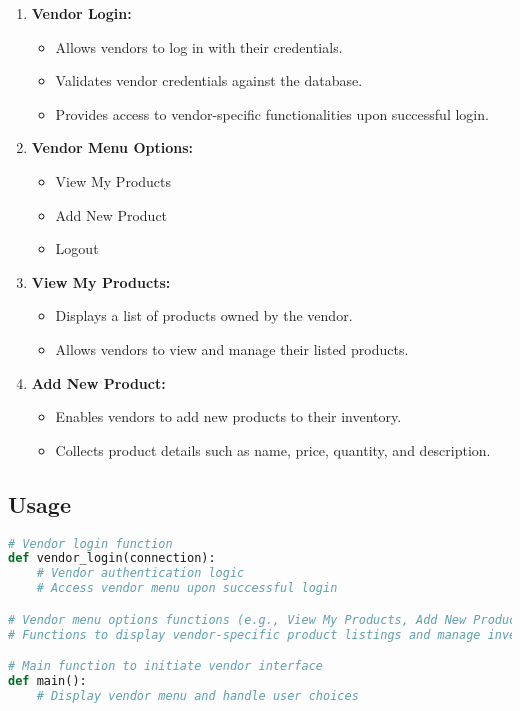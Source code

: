 \documentclass[12pt]{article}
\begin{document}
\begin{enumerate}
    \item \textbf{Vendor Login:}
        \begin{itemize}
            \item Allows vendors to log in with their credentials.
            \item Validates vendor credentials against the database.
            \item Provides access to vendor-specific functionalities upon successful login.
        \end{itemize}
    
    \item \textbf{Vendor Menu Options:}
        \begin{itemize}
            \item View My Products
            \item Add New Product
            \item Logout
        \end{itemize}
    
    \item \textbf{View My Products:}
        \begin{itemize}
            \item Displays a list of products owned by the vendor.
            \item Allows vendors to view and manage their listed products.
        \end{itemize}
    
    \item \textbf{Add New Product:}
        \begin{itemize}
            \item Enables vendors to add new products to their inventory.
            \item Collects product details such as name, price, quantity, and description.
        \end{itemize}
\end{enumerate}

\subsection{Usage}
\begin{lstlisting}[language=Python]
# Vendor login function
def vendor_login(connection):
    # Vendor authentication logic
    # Access vendor menu upon successful login

# Vendor menu options functions (e.g., View My Products, Add New Product)
# Functions to display vendor-specific product listings and manage inventory

# Main function to initiate vendor interface
def main():
    # Display vendor menu and handle user choices
\end{lstlisting}
\end{document}
